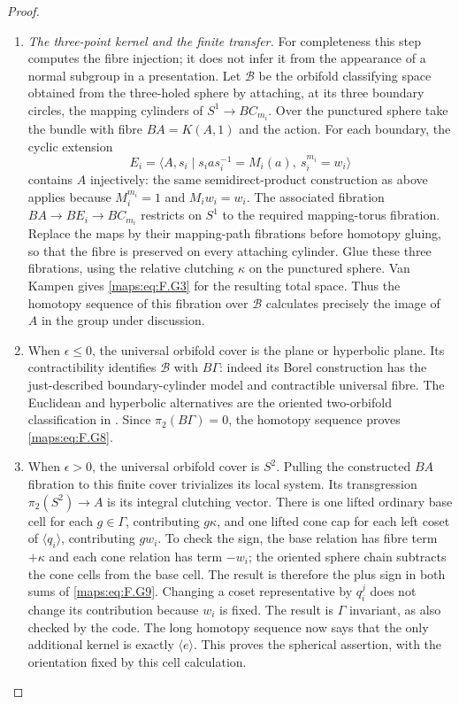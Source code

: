 \begin{proof}
\begin{enumerate}[label={$\langle1\rangle$\arabic*.}]
\item \emph{The three-point kernel and the finite transfer.}
For completeness this step computes the fibre injection; it
does not infer it from the appearance of a normal subgroup in
a presentation.  Let $\mathcal B$ be the orbifold classifying
space obtained from the three-holed sphere by attaching, at
its three boundary circles, the mapping cylinders of
$S^1\to BC_{m_i}$.  Over the punctured sphere take the bundle
with fibre $BA=K(A,1)$ and the action.  For each
boundary, the cyclic extension
\[
 E_i=\langle A,s_i\mid s_i a s_i^{-1}=M_i(a),\ s_i^{m_i}=w_i\rangle
\]
contains $A$ injectively: the same semidirect-product construction
as above applies because $M_i^{m_i}=1$ and $M_iw_i=w_i$.
The associated fibration $BA\to BE_i\to BC_{m_i}$ restricts
on $S^1$ to the required mapping-torus fibration.  Replace the
maps by their mapping-path fibrations before homotopy gluing,
so that the fibre is preserved on every attaching cylinder.
Glue these three fibrations, using the relative clutching
$\kappa$ on the punctured sphere.  Van Kampen gives \eqref{maps:eq:F.G3}
for the resulting total space.  Thus the homotopy sequence
of this fibration over $\mathcal B$ calculates precisely
the image of $A$ in the group under discussion.

\item When $\epsilon\le0$, the universal orbifold cover is the plane
or hyperbolic plane.  Its contractibility identifies
$\mathcal B$ with $B\Gamma$: indeed its Borel construction
has the just-described boundary-cylinder model and contractible
universal fibre.  The Euclidean and hyperbolic alternatives
are the oriented two-orbifold classification in
\cite[Theorems 2.3--2.4, p.~425; Euler-characteristic comparison, pp.~427--428]{rootScott83}.
Since $\pi_2(B\Gamma)=0$, the homotopy sequence proves \eqref{maps:eq:F.G8}.

\item When $\epsilon>0$, the universal orbifold cover is $S^2$.
Pulling the constructed $BA$ fibration to this finite cover
trivializes its local system.  Its transgression
$\pi_2(S^2)\to A$ is its integral clutching vector.
There is one lifted ordinary base cell for each $g\in\Gamma$,
contributing $g\kappa$, and one lifted cone cap for each left
coset of $\langle q_i\rangle$, contributing $gw_i$.
To check the sign, the base relation has fibre term $+\kappa$
and each cone relation has term $-w_i$; the oriented sphere
chain subtracts the cone cells from the base cell.  The result
is therefore the plus sign in both sums of \eqref{maps:eq:F.G9}.
Changing a coset representative by $q_i^j$ does not change
its contribution because $w_i$ is fixed.  The result is
$\Gamma$ invariant, as also checked by the code.  The long
homotopy sequence now says that the only additional kernel
is exactly $\langle e\rangle$.  This proves the spherical
assertion, with the orientation fixed by this cell calculation.


\end{enumerate}
\end{proof}
